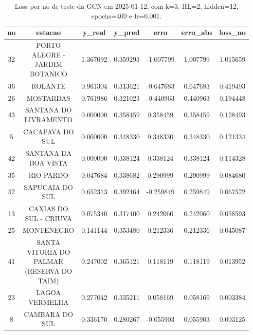 \begin{table}[h]
\centering
\caption{Loss por no de teste da GCN em 2025-01-12, com k=3, HL=2, hidden=12, epochs=400 e lr=0.001.}
\label{tab:gcn_loss_k3_hl2_h12_e400_d20250112}
\begin{tabular}{ccccccc}
\toprule
no & estacao & y\_real & y\_pred & erro & erro\_abs & loss\_no \\
\midrule
32 & PORTO ALEGRE - JARDIM BOTANICO & 1.367092 & 0.359293 & -1.007799 & 1.007799 & 1.015659 \\
36 & ROLANTE & 0.961304 & 0.313621 & -0.647683 & 0.647683 & 0.419493 \\
26 & MOSTARDAS & 0.761986 & 0.321023 & -0.440963 & 0.440963 & 0.194448 \\
43 & SANTANA DO LIVRAMENTO & 0.000000 & 0.358459 & 0.358459 & 0.358459 & 0.128493 \\
5 & CACAPAVA DO SUL & 0.000000 & 0.348330 & 0.348330 & 0.348330 & 0.121334 \\
42 & SANTANA DA BOA VISTA & 0.000000 & 0.338124 & 0.338124 & 0.338124 & 0.114328 \\
35 & RIO PARDO & 0.047684 & 0.338682 & 0.290999 & 0.290999 & 0.084680 \\
52 & SAPUCAIA DO SUL & 0.652313 & 0.392464 & -0.259849 & 0.259849 & 0.067522 \\
13 & CAXIAS DO SUL - CRIUVA & 0.075340 & 0.317400 & 0.242060 & 0.242060 & 0.058593 \\
25 & MONTENEGRO & 0.141144 & 0.353480 & 0.212336 & 0.212336 & 0.045087 \\
41 & SANTA VITORIA DO PALMAR (RESERVA DO TAIM) & 0.247002 & 0.365121 & 0.118119 & 0.118119 & 0.013952 \\
23 & LAGOA VERMELHA & 0.277042 & 0.335211 & 0.058169 & 0.058169 & 0.003384 \\
8 & CAMBARA DO SUL & 0.336170 & 0.280267 & -0.055903 & 0.055903 & 0.003125 \\
\bottomrule
\end{tabular}
\end{table}
